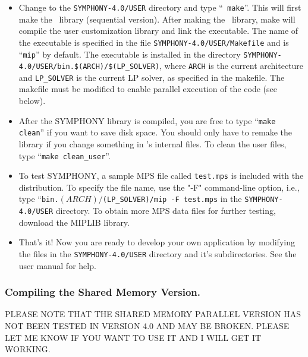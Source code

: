 \begin{itemize}
        \item Change to the \texttt{SYMPHONY-4.0/USER} directory and type
``\texttt{ make}''. This will first make the
\BB\ library (sequential version). After making the \BB\ library, make will
compile the user customization library and link the executable. The name of
the executable is specified in the file \texttt{SYMPHONY-4.0/USER/Makefile}
and is ``\texttt{mip}'' by default. The executable is installed in the directory
\texttt{SYMPHONY-4.0/USER/bin.\$(ARCH)/\$(LP\_SOLVER)}, where \texttt{ARCH} is 
the current architecture and \texttt{LP\_SOLVER} is the current LP solver, as 
specified in the makefile. The makefile must be modified to enable parallel 
execution of the code (see below).

\item After the SYMPHONY library is compiled, you are free to type ``{\tt make
        clean}'' if you want to save disk space. You should only have to
        remake the library if you change something in \BB's internal files. To
        clean the user files, type ``{\tt make
        clean\_user}''.

\item To test SYMPHONY, a sample MPS file called \texttt{test.mps} is included 
with the distribution. To specify the file name, use the "-F" command-line
option, i.e., type ``\texttt{bin.$(ARCH)/$(LP\_SOLVER)/mip -F test.mps} in the
\texttt{SYMPHONY-4.0/USER} directory. To obtain more MPS data files for further
testing, download the MIPLIB library.

\item That's it! Now you are ready to develop your own application by modifying
the files in the \texttt{SYMPHONY-4.0/USER} directory and it's
subdirectories. See the user manual for help.

\end{itemize}

\subsubsection{Compiling the Shared Memory Version.}

PLEASE NOTE THAT THE SHARED MEMORY PARALLEL VERSION HAS NOT BEEN TESTED
IN VERSION 4.0 AND MAY BE BROKEN. PLEASE LET ME KNOW IF YOU WANT TO USE IT AND
I WILL GET IT WORKING.

